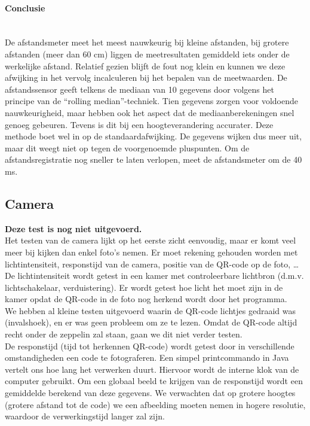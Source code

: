 \documentclass[eind]{penoverslag}
\begin{document}
\paragraph{Conclusie} ~\\ 
De afstandsmeter meet het meest nauwkeurig bij kleine afstanden, bij grotere afstanden (meer dan 60 cm) liggen de meetresultaten gemiddeld iets onder de werkelijke afstand. Relatief gezien blijft de fout nog klein en kunnen we deze afwijking in het vervolg incalculeren bij het bepalen van de meetwaarden. De afstandssensor geeft telkens de mediaan van 10 gegevens door volgens het principe van de “rolling median”-techniek. Tien gegevens zorgen voor voldoende nauwkeurigheid, maar hebben ook het aspect dat de mediaanberekeningen snel genoeg gebeuren. Tevens is dit bij een hoogteverandering accurater. Deze methode boet wel in op de standaardafwijking. De gegevens wijken dus meer uit, maar dit weegt niet op tegen de voorgenoemde pluspunten. Om de afstandsregistratie nog sneller te laten verlopen, meet de afstandsmeter om de 40 ms.

\subsection{Camera}

\textbf{Deze test is nog niet uitgevoerd.} \\

Het testen van de camera lijkt op het eerste zicht eenvoudig, maar er komt veel meer bij kijken dan enkel foto's nemen. Er moet rekening gehouden worden met lichtintensiteit, responstijd van de camera, positie van de QR-code op de foto, \ldots \\

De lichtintensiteit wordt getest in een kamer met controleerbare lichtbron (d.m.v. lichtschakelaar, verduistering). Er wordt getest hoe licht het moet zijn in de kamer opdat de QR-code in de foto nog herkend wordt door het programma. \\

We hebben al kleine testen uitgevoerd waarin de QR-code lichtjes gedraaid was (invalshoek), en er was geen probleem om ze te lezen. Omdat de QR-code altijd recht onder de zeppelin zal staan, gaan we dit niet verder testen. \\

De responstijd (tijd tot herkennen QR-code) wordt getest door in verschillende omstandigheden een code te fotograferen. Een simpel printcommando in Java vertelt ons hoe lang het verwerken duurt. Hiervoor wordt de interne klok van de computer gebruikt. Om een globaal beeld te krijgen van de responstijd wordt een gemiddelde berekend van deze gegevens. We verwachten dat op grotere hoogtes (grotere afstand tot de code) we een afbeelding moeten nemen in hogere resolutie, waardoor de verwerkingstijd langer zal zijn. \\
\end{document}
